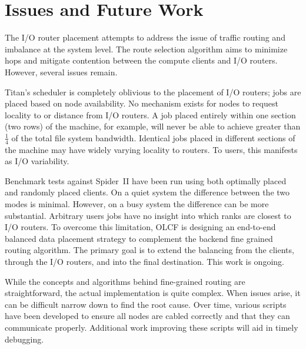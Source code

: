 \section{Issues and Future Work}

The I/O router placement attempts to address the issue of traffic routing and
imbalance at the system level. The route selection algorithm aims to minimize
hops and mitigate contention between the compute clients and I/O routers.
However, several issues remain.

Titan's scheduler is completely oblivious to the placement of I/O routers; jobs
are placed based on node availability.  No mechanism exists for nodes to
request locality to or distance from I/O routers.  A job placed entirely within
one section (two rows) of the machine, for example, will never be able to
achieve greater than $\frac{1}{4}$ of the total file system bandwidth.
Identical jobs placed in different sections of the machine may have widely
varying locality to routers.  To users, this manifests as I/O variability.

Benchmark tests against Spider~II have been run using both optimally placed and
randomly placed clients.  On a quiet system the difference between the two
modes is minimal.  However, on a busy system the difference can be more
substantial.  Arbitrary users jobs have no insight into which ranks are closest
to I/O routers.  To overcome this limitation, OLCF is designing an end-to-end
balanced data placement strategy to complement the backend fine grained routing
algorithm. The primary goal is to extend the balancing from the clients,
through the I/O routers, and into the final destination. This work is ongoing.

While the concepts and algorithms behind fine-grained routing are
straightforward, the actual implementation is quite complex.  When issues
arise, it can be difficult narrow down to find the root cause.  Over time,
various scripts have been developed to ensure all nodes are cabled correctly
and that they can communicate properly.  Additional work improving these
scripts will aid in timely debugging.
